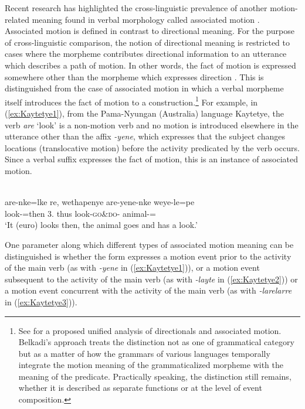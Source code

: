 Recent research has highlighted the cross-linguistic prevalence of another mo\-tion-related meaning found in verbal morphology called associated motion \citep{guillaumeAssociatedMotion2021}. Associated motion is defined in contrast to directional meaning. For the purpose of cross-linguistic comparison, the notion of directional meaning is restricted to cases where the morpheme contributes directional information to an utterance which describes a path of motion. In other words, the fact of motion is expressed somewhere other than the morpheme which expresses direction \citep{guillaumeAssociatedMotionSouth2016}. This is distinguished from the case of associated motion in which a verbal morpheme itself introduces the fact of motion to a construction.\footnote{See \citet{belkadiDeicticDirectionalityAssociated2021} for a proposed unified analysis of directionals and associated motion. Belkadi's approach treats the distinction not as one of grammatical category but as a matter of how the grammars of various languages temporally integrate the motion meaning of the grammaticalized morpheme with the meaning of the predicate. Practically speaking, the distinction still remains, whether it is described as separate functions or at the level of event composition.} For example, in (\ref{ex:Kaytetye1}), from the Pama-Nyungan (Australia) language Kaytetye, the verb \textit{are} ‘look’ is a non-motion verb and no motion is introduced elsewhere in the utterance other than the affix \textit{-yene}, which expresses that the subject changes locations (translocative motion) before the activity predicated by the verb occurs. Since a verbal suffix expresses the fact of motion, this is an instance of associated motion.

\ea\label{ex:Kaytetye1}
 \\
\gll are-nke=lke re, wethapenye are-yene-nke weye-le=pe \\
look-=then 3. thus look-\textsc{go}\&\textsc{do}- animal-= \\
\glt `It (euro) looks then, the animal goes and has a look.'
\z 

One parameter along which different types of associated motion meaning can be distinguished is whether the form expresses a  motion event prior to the activity of the main verb (as with \textit{-yene} in (\ref{ex:Kaytetye1})), or a  motion event subsequent to the activity of the main verb (as with \textit{-layte} in (\ref{ex:Kaytetye2})) or a motion event concurrent with the activity of the main verb (as with \textit{-larelarre} in (\ref{ex:Kaytetye3})).

